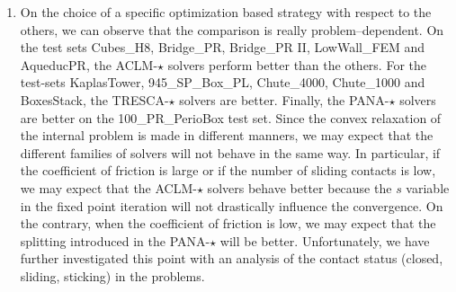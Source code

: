 \begin{enumerate}
\item On the choice of a specific optimization based strategy with respect to the others, we can observe that the comparison is really problem--dependent. On the test sets Cubes\_H8, Bridge\_PR,  Bridge\_PR II, LowWall\_FEM and AqueducPR, the {\sf ACLM-$\star$} solvers perform better than the others.  For the test-sets KaplasTower, 945\_SP\_Box\_PL, Chute\_4000, Chute\_1000 and BoxesStack, the {\sf TRESCA-$\star$} solvers are better. Finally, the {\sf PANA-$\star$} solvers are better on the 100\_PR\_PerioBox test set. Since the convex relaxation of the internal problem is made in different manners, we may expect that the different families  of solvers will not behave in the same way. In particular, if the coefficient of friction is large or if the number of sliding contacts is low, we may expect that the {\sf ACLM-$\star$} solvers behave better because the $s$ variable in the fixed point iteration will not drastically influence the convergence. On the contrary, when the coefficient of friction is low, we may expect that the splitting introduced in the {\sf PANA-$\star$} will be better. Unfortunately, we have further investigated this point with an analysis of the contact status (closed, sliding, sticking) in the problems.
\end{enumerate}




